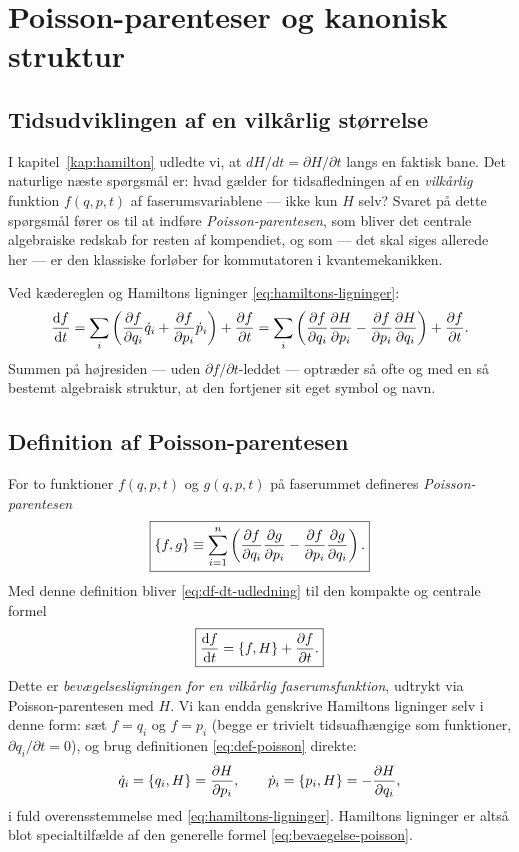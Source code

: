 
\chapter{Poisson-parenteser og kanonisk struktur}
\label{kap:poisson}

\section{Tidsudviklingen af en vilkårlig størrelse}

I kapitel~\ref{kap:hamilton} udledte vi, at $dH/dt=\partial H/\partial t$
langs en faktisk bane. Det naturlige næste spørgsmål er: hvad gælder
for tidsafledningen af en \emph{vilkårlig} funktion
$f(q,p,t)$ af faserumsvariablene — ikke kun $H$ selv? Svaret på dette
spørgsmål fører os til at indføre \emph{Poisson-parentesen}, som
bliver det centrale algebraiske redskab for resten af kompendiet, og
som — det skal siges allerede her — er den klassiske forløber for
kommutatoren i kvantemekanikken.

Ved kædereglen og Hamiltons ligninger \eqref{eq:hamiltons-ligninger}:
\begin{equation}
  \dv{f}{t} = \sum_i\left(\pdv{f}{q_i}\dot q_i + \pdv{f}{p_i}\dot p_i\right) + \pdv{f}{t}
  = \sum_i\left(\pdv{f}{q_i}\pdv{H}{p_i} - \pdv{f}{p_i}\pdv{H}{q_i}\right) + \pdv{f}{t}.
  \label{eq:df-dt-udledning}
\end{equation}
Summen på højresiden — uden $\partial f/\partial t$-leddet — optræder
så ofte og med en så bestemt algebraisk struktur, at den fortjener sit
eget symbol og navn.

\section{Definition af Poisson-parentesen}

For to funktioner $f(q,p,t)$ og $g(q,p,t)$ på faserummet defineres
\emph{Poisson-parentesen}
\begin{equation}
  \boxed{\{f,g\} \equiv \sum_{i=1}^n\left(\pdv{f}{q_i}\pdv{g}{p_i} - \pdv{f}{p_i}\pdv{g}{q_i}\right).}
  \label{eq:def-poisson}
\end{equation}
Med denne definition bliver \eqref{eq:df-dt-udledning} til den
kompakte og centrale formel
\begin{equation}
  \boxed{\dv{f}{t} = \{f,H\} + \pdv{f}{t}.}
  \label{eq:bevaegelse-poisson}
\end{equation}
Dette er \emph{bevægelsesligningen for en vilkårlig faserumsfunktion},
udtrykt via Poisson-parentesen med $H$. Vi kan endda genskrive
Hamiltons ligninger selv i denne form: sæt $f=q_i$ og $f=p_i$
(begge er trivielt tidsuafhængige som funktioner, $\partial q_i/\partial t=0$),
og brug definitionen \eqref{eq:def-poisson} direkte:
\begin{equation}
  \dot q_i = \{q_i,H\} = \pdv{H}{p_i}, \qquad
  \dot p_i = \{p_i,H\} = -\pdv{H}{q_i},
\end{equation}
i fuld overensstemmelse med \eqref{eq:hamiltons-ligninger}. Hamiltons
ligninger er altså blot specialtilfælde af den generelle formel
\eqref{eq:bevaegelse-poisson}.


